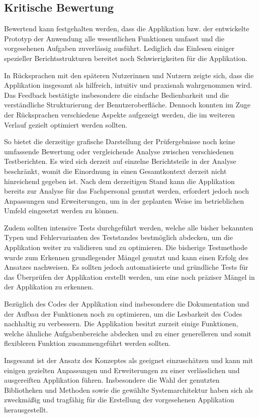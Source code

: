 \subsection{Kritische Bewertung}
\label{subsec:kritische-bewertung}

Bewertend kann festgehalten werden, dass die Applikation bzw. der entwickelte Prototyp der Anwendung alle wesentlichen Funktionen umfasst und die vorgesehenen Aufgaben zuverlässig ausführt.
Lediglich das Einlesen einiger spezieller Berichtsstrukturen bereitet noch Schwierigkeiten für die Applikation.

In Rücksprachen mit den späteren Nutzerinnen und Nutzern zeigte sich, dass die Applikation insgesamt als hilfreich, intuitiv und praxisnah wahrgenommen wird.
Das Feedback bestätigte insbesondere die einfache Bedienbarkeit und die verständliche Strukturierung der Benutzeroberfläche.
Dennoch konnten im Zuge der Rücksprachen verschiedene Aspekte aufgezeigt werden, die im weiteren Verlauf gezielt optimiert werden sollten.

So bietet die derzeitige grafische Darstellung der Prüfergebnisse noch keine umfassende Bewertung oder vergleichende Analyse zwischen verschiedenen Testberichten.
Es wird sich derzeit auf einzelne Berichtsteile in der Analyse beschränkt, womit die Einordnung in einen Gesamtkontext derzeit nicht hinreichend gegeben ist.
Nach dem derzeitigen Stand kann die Applikation bereits zur Analyse für das Fachpersonal genutzt werden, erfordert jedoch noch Anpassungen und Erweiterungen, um in der geplanten Weise im betrieblichen Umfeld eingesetzt werden zu können.

Zudem sollten intensive Tests durchgeführt werden, welche alle bisher bekannten Typen und Fehlervarianten des Teststandes bestmöglich abdecken, um die Applikation weiter zu validieren und zu optimieren.
Die bisherige Testmethode wurde zum Erkennen grundlegender Mängel genutzt und kann einen Erfolg des Ansatzes nachweisen.
Es sollten jedoch automatisierte und gründliche Tests für das Überprüfen der Applikation erstellt werden, um eine noch präziser Mängel in der Applikation zu erkennen.

Bezüglich des Codes der Applikation sind insbesondere die Dokumentation und der Aufbau der Funktionen noch zu optimieren, um die Lesbarkeit des Codes nachhaltig zu verbessern.
Die Applikation besitzt zurzeit einige Funktionen, welche ähnliche Aufgabenbereiche abdecken und zu einer generelleren und somit flexibleren Funktion zusammengeführt werden sollten.

Insgesamt ist der Ansatz des Konzeptes als geeignet einzuschätzen und kann mit einigen gezielten Anpassungen und Erweiterungen zu einer verlässlichen und ausgereiften Applikation führen.
Insbesondere die Wahl der genutzten Bibliotheken und Methoden sowie die gewählte Systemarchitektur haben sich als zweckmäßig und tragfähig für die Erstellung der
vorgesehenen Applikation herausgestellt.












